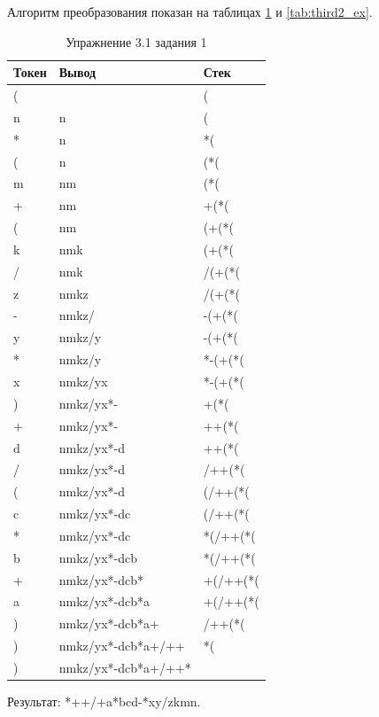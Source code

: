 \documentclass[a4paper, 14pt]{extarticle}
\begin{document}
Алгоритм преобразования показан на таблицах \ref{tab:third1_ex} и 
\ref{tab:third2_ex}.
\begin{longtable}[htpb]{|p{3cm}|p{5cm}|p{3cm}|}
  \caption{Упражнение 3.1 задания 1}
  \label{tab:third1_ex}
  \\
    \hline
    Токен & Вывод & Стек
    \\ \hline
    ( & & (
    \\ \hline
    n & n & (
    \\ \hline
    * & n & *(
    \\ \hline
    ( & n & (*(
    \\ \hline
    m & nm & (*(
    \\ \hline
    + & nm & +(*(
    \\ \hline
    ( & nm & (+(*(
    \\ \hline
    k & nmk & (+(*(
    \\ \hline
    / & nmk & /(+(*(
    \\ \hline
    z & nmkz & /(+(*(
    \\ \hline
    - & nmkz/ & -(+(*(
    \\ \hline
    y & nmkz/y & -(+(*(
    \\ \hline
    * & nmkz/y & *-(+(*(
    \\ \hline
    x & nmkz/yx & *-(+(*(
    \\ \hline
    ) & nmkz/yx*- & +(*(
    \\ \hline
    + & nmkz/yx*- & ++(*(
    \\ \hline
    d & nmkz/yx*-d & ++(*(
    \\ \hline
    / & nmkz/yx*-d & /++(*(
    \\ \hline
    ( & nmkz/yx*-d & (/++(*(
    \\ \hline
    c & nmkz/yx*-dc & (/++(*(
    \\ \hline
    * & nmkz/yx*-dc & *(/++(*(
    \\ \hline
    b & nmkz/yx*-dcb & *(/++(*(
    \\ \hline
    + & nmkz/yx*-dcb* & +(/++(*(
    \\ \hline
    a & nmkz/yx*-dcb*a & +(/++(*(
    \\ \hline
    ) & nmkz/yx*-dcb*a+ & /++(*(
    \\ \hline
    ) & nmkz/yx*-dcb*a+/++ & *(
    \\ \hline
    ) & nmkz/yx*-dcb*a+/++* &
    \\ \hline
    \end{longtable}
Результат: *++/+a*bcd-*xy/zkmn.
\end{document}

